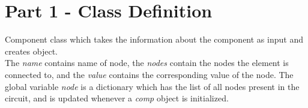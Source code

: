 \documentclass[11pt]{article}
\begin{document}
	

	

	
		
    \hypertarget{part-1---class-definition}{%
\section{Part 1 - Class Definition}\label{part-1---class-definition}}

Component class which takes the information about the component as input
and creates object.\\
The \emph{name} contains name of node, the \emph{nodes} contain the
nodes the element is connected to, and the \emph{value} contains the
corresponding value of the node. The global variable \emph{node} is a
dictionary which has the list of all nodes present in the circuit, and
is updated whenever a \emph{comp} object is initialized.

	

	
		
	
	
		
			
		
	
		
			
		
	
		
			
		
	
		
			
		
	
		
			
		
	
		
			
		
	
		
			
		
	
		
			
		
	
		
			
		
	
		
			
		
	
		
			
		
	
		
			
		
	
		
			
		
	
		
			
		
	
		
			
		
	
		
			
		
	
		
			
\end{document}
